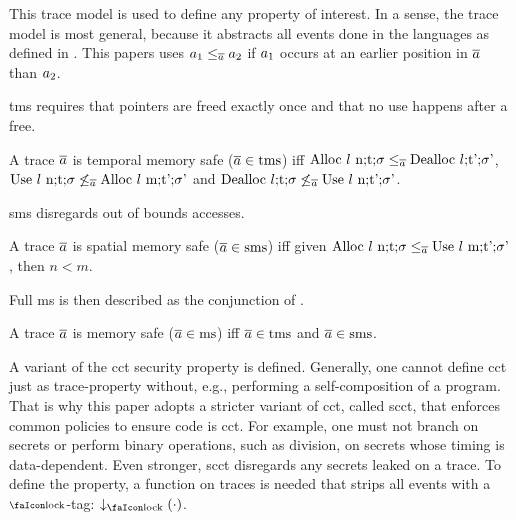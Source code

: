 \documentclass[acmsmall,review,screen,dvipsnames]{acmart}
\begin{document}
This trace model is used to define any property of interest.
In a sense, the trace model is most general, because it abstracts all events done in the languages as defined in .
This papers uses $\event[_{1}]\le_{\trace}\event[_{2}]$ if $\event[_{1}]$ occurs at an earlier position in $\trace$ than $\event[_{2}]$.

\gls{tms} requires that pointers are freed exactly once and that no use happens after a free.

\begin{definition}\label{def:trace:tmsdef}
  A trace $\trace$ is temporal memory safe ($\trace\in\tmssafe$) iff $\ev{Alloc\ \loc\ n;\sandboxtag;\securitytag}\le_{\trace}\ev{Dealloc\ \loc;\sandboxtag';\securitytag'}$, $\ev{Use\ \loc\ n;\sandboxtag;\securitytag}\not\le_{\trace}\ev{Alloc\ \loc\ m;\sandboxtag';\securitytag'}$ and $\ev{Dealloc\ \loc;\sandboxtag;\securitytag}\not\le_{\trace}\ev{Use\ \loc\ n;\sandboxtag';\securitytag'}$.
\end{definition}

\gls{sms} disregards out of bounds accesses.

\begin{definition}\label{def:trace:smsdef}
  A trace $\trace$ is spatial memory safe ($\trace\in\smssafe$) iff given $\ev{Alloc\ \loc\ n;\sandboxtag;\securitytag}\le_{\trace}\ev{Use\ \loc\ m;\sandboxtag';\securitytag'}$, then $n<m$.
\end{definition}

Full \gls{ms} is then described as the conjunction of .

\begin{definition}[\glsfirst{ms}]\label{def:trace:msdef}
  A trace $\trace$ is memory safe ($\trace\in\mssafe$) iff $\trace\in\tmssafe$ and $\trace\in\smssafe$.
\end{definition}

A variant of the \gls{cct} security property is defined.
Generally, one cannot define \gls{cct} just as trace-property without, e.g., performing a self-composition of a program.
That is why this paper adopts a stricter variant of \gls{cct}, called \gls{scct}, that enforces common policies to ensure code is \gls{cct}.
For example, one must not branch on secrets or perform binary operations, such as division, on secrets whose timing is data-dependent.
Even stronger, \gls{scct} disregards any secrets leaked on a trace.
To define the property, a function on traces is needed that strips all events with a $\lock$-tag: $\downarrow_{\lock}(\cdot)$.
\end{document}
